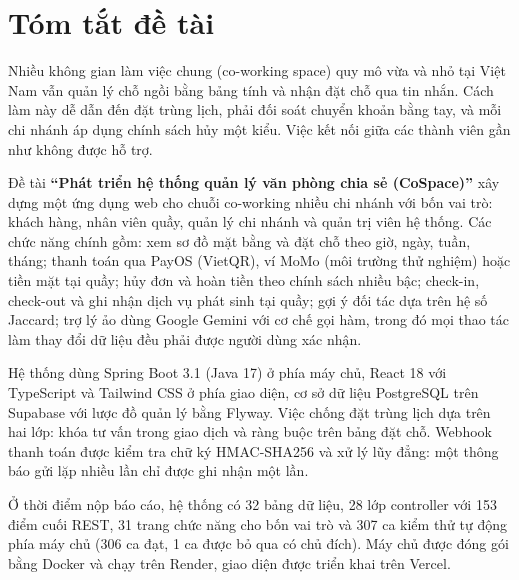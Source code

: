 \chapter*{Tóm tắt đề tài}

Nhiều không gian làm việc chung (co-working space) quy mô vừa và nhỏ tại Việt Nam vẫn quản lý chỗ ngồi bằng bảng tính và nhận đặt chỗ qua tin nhắn. Cách làm này dễ dẫn đến đặt trùng lịch, phải đối soát chuyển khoản bằng tay, và mỗi chi nhánh áp dụng chính sách hủy một kiểu. Việc kết nối giữa các thành viên gần như không được hỗ trợ.

Đề tài \textbf{``Phát triển hệ thống quản lý văn phòng chia sẻ (CoSpace)''} xây dựng một ứng dụng web cho chuỗi co-working nhiều chi nhánh với bốn vai trò: khách hàng, nhân viên quầy, quản lý chi nhánh và quản trị viên hệ thống. Các chức năng chính gồm: xem sơ đồ mặt bằng và đặt chỗ theo giờ, ngày, tuần, tháng; thanh toán qua PayOS (VietQR), ví MoMo (môi trường thử nghiệm) hoặc tiền mặt tại quầy; hủy đơn và hoàn tiền theo chính sách nhiều bậc; check-in, check-out và ghi nhận dịch vụ phát sinh tại quầy; gợi ý đối tác dựa trên hệ số Jaccard; trợ lý ảo dùng Google Gemini với cơ chế gọi hàm, trong đó mọi thao tác làm thay đổi dữ liệu đều phải được người dùng xác nhận.

Hệ thống dùng Spring Boot 3.1 (Java 17) ở phía máy chủ, React 18 với TypeScript và Tailwind CSS ở phía giao diện, cơ sở dữ liệu PostgreSQL trên Supabase với lược đồ quản lý bằng Flyway. Việc chống đặt trùng lịch dựa trên hai lớp: khóa tư vấn  trong giao dịch và ràng buộc  trên bảng đặt chỗ. Webhook thanh toán được kiểm tra chữ ký HMAC-SHA256 và xử lý lũy đẳng: một thông báo gửi lặp nhiều lần chỉ được ghi nhận một lần.

Ở thời điểm nộp báo cáo, hệ thống có 32 bảng dữ liệu, 28 lớp controller với 153 điểm cuối REST, 31 trang chức năng cho bốn vai trò và 307 ca kiểm thử tự động phía máy chủ (306 ca đạt, 1 ca được bỏ qua có chủ đích). Máy chủ được đóng gói bằng Docker và chạy trên Render, giao diện được triển khai trên Vercel.

